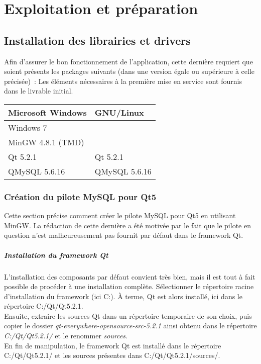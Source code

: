 \chapter{Exploitation et préparation}

% 

\section{Installation des librairies et drivers}
Afin d'assurer le bon fonctionnement de l'application, cette dernière requiert que soient présents les packages suivants (dans une version égale ou supérieure à celle précisée)~:
Les éléments nécessaires à la première mise en service sont fournis dans le livrable initial.
\\

\begin{tabularx}{\linewidth}{X X}
	\toprule
	Microsoft Windows	& GNU/Linux		\\
	\midrule
	Windows 7			&				\\
	MinGW 4.8.1 (TMD)	&				\\
	Qt 5.2.1			& Qt 5.2.1		\\
	QMySQL 5.6.16		& QMySQL 5.6.16				\\
	\bottomrule
\end{tabularx}

\subsection{Création du pilote MySQL pour Qt5}
Cette section précise comment créer le pilote MySQL pour Qt5 en utilisant MinGW.
La rédaction de cette dernière a été motivée par le fait que le pilote en question n'est malheureusement pas fournit par défaut dans le framework Qt.


\paragraph{Installation du framework Qt}
L'installation des composants par défaut convient très bien, mais il est tout à fait possible de procéder à une installation complète. Sélectionner le répertoire racine d'installation du framework (ici C:). À terme, Qt est alors installé, ici dans le répertoire C:/Qt/Qt5.2.1.
\\
Ensuite, extraire les sources Qt dans un répertoire temporaire de son choix, puis copier le dossier \textit{qt-everywhere-opensource-src-5.2.1} ainsi obtenu dans le répertoire \textit{C:/Qt/Qt5.2.1/} et le renommer \textit{sources}.
\\
En fin de manipulation, le framework Qt est installé dans le répertoire C:/Qt/Qt5.2.1/ et les sources présentes dans C:/Qt/Qt5.2.1/sources/.

